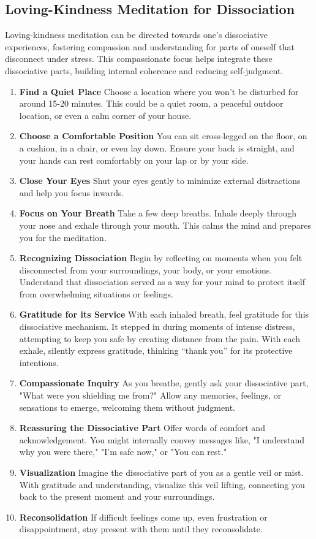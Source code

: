 \documentclass[12pt,letterpaper]{article}
\begin{document}
\subsection{Loving-Kindness Meditation for Dissociation}
\label{lkmeditation}
Loving-kindness meditation can be directed towards one's dissociative experiences, fostering compassion and understanding for parts of oneself that disconnect under stress. This compassionate focus helps integrate these dissociative parts, building internal coherence and reducing self-judgment.
\begin{enumerate}
    \item \textbf{Find a Quiet Place} Choose a location where you won't be disturbed for around 15-20 minutes. This could be a quiet room, a peaceful outdoor location, or even a calm corner of your house.
    \item \textbf{Choose a Comfortable Position} You can sit cross-legged on the floor, on a cushion, in a chair, or even lay down. Ensure your back is straight, and your hands can rest comfortably on your lap or by your side.
    \item \textbf{Close Your Eyes} Shut your eyes gently to minimize external distractions and help you focus inwards.
    \item \textbf{Focus on Your Breath} Take a few deep breaths. Inhale deeply through your nose and exhale through your mouth. This calms the mind and prepares you for the meditation.
    \item \textbf{Recognizing Dissociation} Begin by reflecting on moments when you felt disconnected from your surroundings, your body, or your emotions. Understand that dissociation served as a way for your mind to protect itself from overwhelming situations or feelings.
    \item \textbf{Gratitude for its Service} With each inhaled breath, feel gratitude for this dissociative mechanism. It stepped in during moments of intense distress, attempting to keep you safe by creating distance from the pain. With each exhale, silently express gratitude, thinking “thank you” for its protective intentions.
    \item \textbf{Compassionate Inquiry} As you breathe, gently ask your dissociative part, "What were you shielding me from?" Allow any memories, feelings, or sensations to emerge, welcoming them without judgment.
    \item \textbf{Reassuring the Dissociative Part} Offer words of comfort and acknowledgement. You might internally convey messages like, "I understand why you were there," "I'm safe now," or "You can rest."
    \item \textbf{Visualization} Imagine the dissociative part of you as a gentle veil or mist. With gratitude and understanding, visualize this veil lifting, connecting you back to the present moment and your surroundings.
    \item \textbf{Reconsolidation} If difficult feelings come up, even frustration or disappointment, stay present with them until they reconsolidate.
\end{enumerate}
\end{document}
